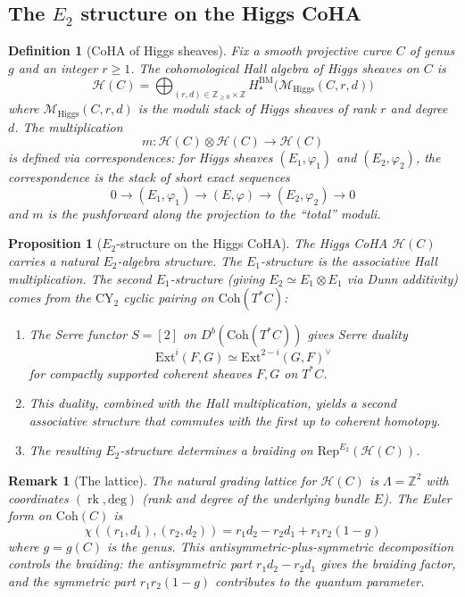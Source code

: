 \documentclass[11pt]{article}
\theoremstyle{garamondthm}
\newtheorem{proposition}[theorem]{Proposition}
\theoremstyle{garamonddef}
\newtheorem{definition}[theorem]{Definition}
\theoremstyle{garamondrem}
\newtheorem{remark}[theorem]{Remark}
\newcommand{\Rep}{\mathrm{Rep}}
\newcommand{\Coh}{\mathrm{Coh}}
\newcommand{\CY}{\mathrm{CY}}
\newcommand{\Eone}{E_1}
\newcommand{\Etwo}{E_2}
\newcommand{\Ext}{\mathrm{Ext}}
\newcommand{\cH}{\mathcal{H}}
\newcommand{\cM}{\mathcal{M}}
\newcommand{\Higgs}{\mathrm{Higgs}}
\renewcommand{\deg}{\mathrm{deg}}
\DeclareMathOperator{\rk}{rk}
\begin{document}
\subsection{The $\Etwo$ structure on the Higgs CoHA}
\label{ssec:e2-higgs-coha}

\begin{definition}[CoHA of Higgs sheaves]
\label{def:higgs-coha}
Fix a smooth projective curve $C$ of genus $g$ and an integer $r \geq 1$. The \emph{cohomological Hall algebra of Higgs sheaves} on $C$ is
\[
 \cH(C) = \bigoplus_{(r,d) \in \mathbb{Z}_{\geq 0} \times \mathbb{Z}} H^{\mathrm{BM}}_*\!\big(\cM_{\Higgs}(C, r, d)\big)
\]
where $\cM_{\Higgs}(C, r, d)$ is the moduli stack of Higgs sheaves of rank $r$ and degree $d$. The multiplication
\[
 m \colon \cH(C) \otimes \cH(C) \longrightarrow \cH(C)
\]
is defined via correspondences: for Higgs sheaves $(E_1, \varphi_1)$ and $(E_2, \varphi_2)$, the correspondence is the stack of short exact sequences
\[
 0 \to (E_1, \varphi_1) \to (E, \varphi) \to (E_2, \varphi_2) \to 0
\]
and $m$ is the pushforward along the projection to the ``total'' moduli.
\end{definition}

\begin{proposition}[$\Etwo$-structure on the Higgs CoHA]
\label{prop:higgs-coha-e2}
The Higgs CoHA $\cH(C)$ carries a natural $\Etwo$-algebra structure. The $\Eone$-structure is the associative Hall multiplication. The second $\Eone$-structure (giving $\Etwo \simeq \Eone \otimes \Eone$ via Dunn additivity) comes from the $\CY_2$ cyclic pairing on $\Coh(T^*C)$:
\begin{enumerate}[label=(\roman*)]
 \item The Serre functor $S = [2]$ on $D^b(\Coh(T^*C))$ gives Serre duality
 \[
 \Ext^i(F, G) \simeq \Ext^{2-i}(G, F)^\vee
 \]
 for compactly supported coherent sheaves $F, G$ on $T^*C$.
 \item This duality, combined with the Hall multiplication, yields a second associative structure that commutes with the first up to coherent homotopy.
 \item The resulting $\Etwo$-structure determines a braiding on $\Rep^{\Etwo}(\cH(C))$.
\end{enumerate}
\end{proposition}

\begin{remark}[The lattice]
\label{rem:lattice}
The natural grading lattice for $\cH(C)$ is $\Lambda = \mathbb{Z}^2$ with coordinates $(\rk, \deg)$ (rank and degree of the underlying bundle $E$). The Euler form on $\Coh(C)$ is
\[
 \chi((r_1, d_1), (r_2, d_2)) = r_1 d_2 - r_2 d_1 + r_1 r_2 (1 - g)
\]
where $g = g(C)$ is the genus. This antisymmetric-plus-symmetric decomposition controls the braiding: the antisymmetric part $r_1 d_2 - r_2 d_1$ gives the braiding factor, and the symmetric part $r_1 r_2(1-g)$ contributes to the quantum parameter.
\end{remark}
\end{document}
